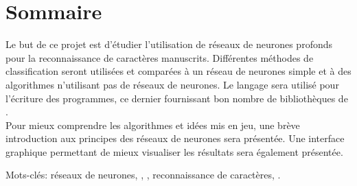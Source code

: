 
\chapter{Sommaire}

Le but de ce projet est d'étudier l'utilisation de réseaux de neurones 
profonds pour la reconnaissance de caractères manuscrits. 
Différentes méthodes de classification seront utilisées et comparées à un réseau 
de neurones simple et à des algorithmes n'utilisant pas de réseaux de neurones.
Le langage \Python sera utilisé pour l'écriture des programmes, ce dernier 
fournissant bon nombre de bibliothèques de . \\
Pour mieux comprendre les algorithmes et idées mis en jeu, une brève 
introduction aux principes des réseaux de neurones sera présentée. 
Une interface graphique permettant de mieux visualiser les résultats sera 
également présentée.

\vspace{1cm}

Mots-clés: réseaux de neurones, , , reconnaissance de caractères, \Python.

\vfill
